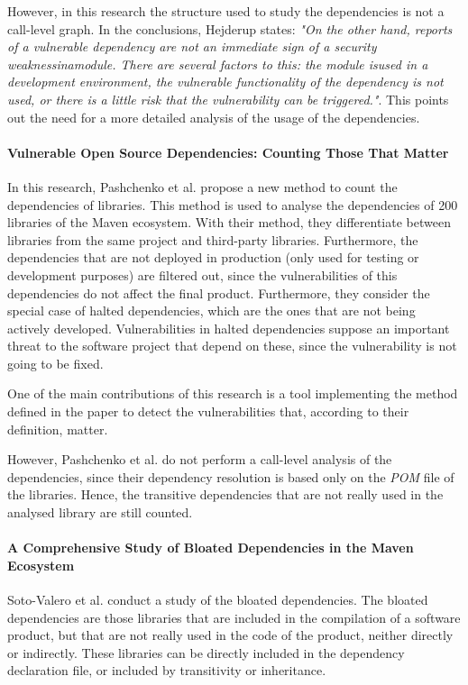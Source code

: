 However, in this research the structure used to study the dependencies is not a call-level graph. In the conclusions, Hejderup states: \textit{"On the other hand, reports of a vulnerable dependency are not an immediate sign of a security weaknessinamodule. There are several factors to this: the module isused in a development environment, the vulnerable functionality of the dependency is not used, or there is a little risk that the vulnerability can be triggered."}. This points out the need for a more detailed analysis of the usage of the dependencies.

\paragraph{Vulnerable Open Source Dependencies: Counting Those That Matter \cite{pashchenko2018vulnerable}}
In this research, Pashchenko et al. propose a new method to count the dependencies of libraries. This method is used to analyse the dependencies of 200 libraries of the Maven ecosystem. With their method, they differentiate between libraries from the same project and third-party libraries. Furthermore, the dependencies that are not deployed in production (only used for testing or development purposes) are filtered out, since the vulnerabilities of this dependencies do not affect the final product. Furthermore, they consider the special case of halted dependencies, which are the ones that are not being actively developed. Vulnerabilities in halted dependencies suppose an important threat to the software project that depend on these, since the vulnerability is not going to be fixed.

One of the main contributions of this research is a tool implementing the method defined in the paper to detect the vulnerabilities that, according to their definition, matter.

However, Pashchenko et al. do not perform a call-level analysis of the dependencies, since their dependency resolution is based only on the \textit{POM} file of the libraries. Hence, the transitive dependencies that are not really used in the analysed library are still counted.

\paragraph{A Comprehensive Study of Bloated Dependencies in the Maven Ecosystem \cite{soto2020comprehensive}}
Soto-Valero et al. conduct a study of the bloated dependencies. The bloated dependencies are those libraries that are included in the compilation of a software product, but that are not really used in the code of the product, neither directly or indirectly. These libraries can be directly included in the dependency declaration file, or included by transitivity or inheritance.

